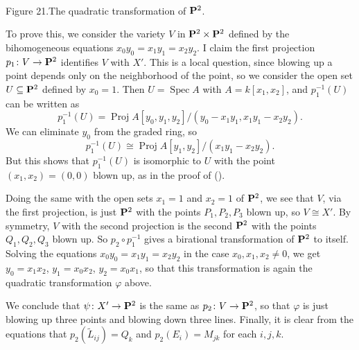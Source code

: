 {\begin{center}
\\[3pt]
\small\hypertarget{fig-book-21}{}Figure 21.\quad The quadratic transformation of $\mathbf{P}^2$.
\end{center}

To prove this, we consider the variety $V$ in $\mathbf{P}^2\times\mathbf{P}^2$ defined by the bihomogeneous equations $x_0y_0=x_1y_1=x_2y_2$. I claim the first projection $p_1\colon V\to\mathbf{P}^2$ identifies $V$ with $X'$. This is a local question, since blowing up a point depends only on the neighborhood of the point, so we consider the open set $U\subseteq\mathbf{P}^2$ defined by $x_0=1$. Then $U=\operatorname{Spec}A$ with $A=k[x_1,x_2]$, and $p_1^{-1}(U)$ can be written as
\[
p_1^{-1}(U)=\operatorname{Proj} A[y_0,y_1,y_2]/(y_0-x_1y_1,x_1y_1-x_2y_2).
\]
\noindent We can eliminate $y_0$ from the graded ring, so
\[
p_1^{-1}(U)\cong\operatorname{Proj} A[y_1,y_2]/(x_1y_1-x_2y_2).
\]
\noindent But this shows that $p_1^{-1}(U)$ is isomorphic to $U$ with the point $(x_1,x_2)=(0,0)$ blown up, as in the proof of ().

Doing the same with the open sets $x_1=1$ and $x_2=1$ of $\mathbf{P}^2$, we see that $V$, via the first projection, is just $\mathbf{P}^2$ with the points $P_1,P_2,P_3$ blown up, so $V\cong X'$. By symmetry, $V$ with the second projection is the second $\mathbf{P}^2$ with the points $Q_1,Q_2,Q_3$ blown up. So $p_2\circ p_1^{-1}$ gives a birational transformation of $\mathbf{P}^2$ to itself. Solving the equations $x_0y_0=x_1y_1=x_2y_2$ in the case $x_0,x_1,x_2\ne0$, we get $y_0=x_1x_2$, $y_1=x_0x_2$, $y_2=x_0x_1$, so that this transformation is again the quadratic transformation $\varphi$ above.

We conclude that $\psi\colon X'\to\mathbf{P}^2$ is the same as $p_2\colon V\to\mathbf{P}^2$, so that $\varphi$ is just blowing up three points and blowing down three lines. Finally, it is clear from the equations that $p_2(\widetilde L_{ij})=Q_k$ and $p_2(E_i)=M_{jk}$ for each $i,j,k$.
}
